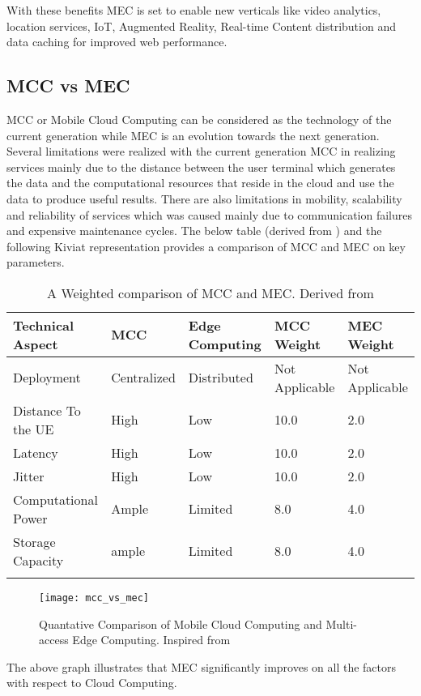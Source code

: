 With these benefits MEC is set to enable new verticals like video analytics, location services, IoT, Augmented Reality, Real-time Content distribution and data caching for improved web performance. 

\subsection{MCC vs MEC}

MCC or Mobile Cloud Computing can be considered as the technology of the current generation while MEC is an evolution towards the next generation. Several limitations were realized with the current generation MCC in realizing services mainly due to the distance between the user terminal which generates the data and the computational resources that reside in the cloud and use the data to produce useful results. There are also limitations in mobility, scalability and reliability of services which was caused mainly due to communication failures and expensive maintenance cycles. The below table (derived from \cite[p.1628]{mach17}) and the following Kiviat representation provides a comparison of MCC and MEC on key parameters.

\newpage
\begin{longtable}[t!]{|p{}|p{}|p{}|p{}|p{}|}
\hline\hline
\textbf{Technical Aspect}&\textbf{MCC}&\textbf{Edge Computing}&\textbf{MCC Weight}&\textbf{MEC Weight}\\
\hline\hline
\hline
Deployment&Centralized&Distributed&Not Applicable&Not Applicable\\
\hline
Distance To the UE&High&Low&10.0&2.0\\
\hline
Latency&High&Low&10.0&2.0\\
\hline
Jitter&High&Low&10.0&2.0\\
\hline
Computational Power&Ample&Limited&8.0&4.0\\
\hline
Storage Capacity&ample&Limited&8.0&4.0\\
\hline
\hline\hline

\caption{A Weighted comparison of MCC and MEC\@. Derived from \cite[p.1628]{mach17}}
\label{tab:tab1}
\end{longtable}

\begin{figure}[h!]
\texttt{[image: mcc\_vs\_mec]}
\label{fig:2}
\caption{Quantative Comparison of Mobile Cloud Computing and Multi-access Edge Computing. Inspired from \protect\cite{mach17}}
\end{figure}

The above graph illustrates that MEC significantly improves on all the factors with respect to Cloud Computing.
